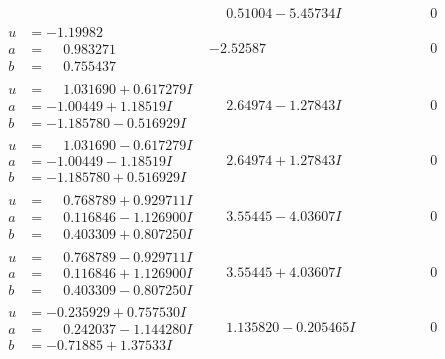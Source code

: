 \documentclass[1p]{elsarticle_modified}
\theoremstyle{definition}
\begin{document}
$$\begin{array}{c|c|c}
 & \phantom{-}0.51004 - 5.45734 I & \phantom{-0.000000 } 0 \\ \hline\begin{aligned}
u &= -1.19982\phantom{ +0.000000I} \\
a &= \phantom{-}0.983271\phantom{ +0.000000I} \\
b &= \phantom{-}0.755437\phantom{ +0.000000I}\end{aligned}
 & -2.52587\phantom{ +0.000000I} & \phantom{-0.000000 } 0 \\ \hline\begin{aligned}
u &= \phantom{-}1.031690 + 0.617279 I \\
a &= -1.00449 + 1.18519 I \\
b &= -1.185780 - 0.516929 I\end{aligned}
 & \phantom{-}2.64974 - 1.27843 I & \phantom{-0.000000 } 0 \\ \hline\begin{aligned}
u &= \phantom{-}1.031690 - 0.617279 I \\
a &= -1.00449 - 1.18519 I \\
b &= -1.185780 + 0.516929 I\end{aligned}
 & \phantom{-}2.64974 + 1.27843 I & \phantom{-0.000000 } 0 \\ \hline\begin{aligned}
u &= \phantom{-}0.768789 + 0.929711 I \\
a &= \phantom{-}0.116846 - 1.126900 I \\
b &= \phantom{-}0.403309 + 0.807250 I\end{aligned}
 & \phantom{-}3.55445 - 4.03607 I & \phantom{-0.000000 } 0 \\ \hline\begin{aligned}
u &= \phantom{-}0.768789 - 0.929711 I \\
a &= \phantom{-}0.116846 + 1.126900 I \\
b &= \phantom{-}0.403309 - 0.807250 I\end{aligned}
 & \phantom{-}3.55445 + 4.03607 I & \phantom{-0.000000 } 0 \\ \hline\begin{aligned}
u &= -0.235929 + 0.757530 I \\
a &= \phantom{-}0.242037 - 1.144280 I \\
b &= -0.71885 + 1.37533 I\end{aligned}
 & \phantom{-}1.135820 - 0.205465 I & \phantom{-0.000000 } 0 \\ \hline\begin{aligned}

\end{aligned}
\end{array}$$
\end{document}
